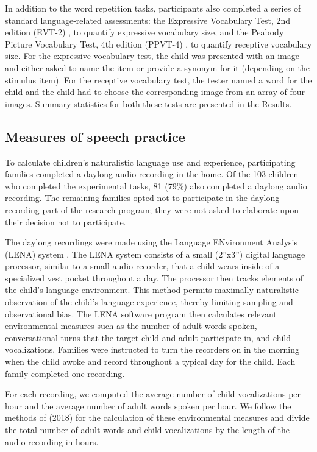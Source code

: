\documentclass[a4paper,man,natbib,donotrepeattitle, apacite]{apa6}
\begin{document}
In addition to the word repetition tasks, participants also completed a series of standard language-related assessments: the Expressive Vocabulary Test, 2nd edition (EVT-2) \cite{williamsExpressiveVocabularyTest2007}, to quantify expressive vocabulary size, and the Peabody Picture Vocabulary Test, 4th edition (PPVT-4) \cite{dunnPPVT4PeabodyPicture2007}, to quantify receptive vocabulary size. For the expressive vocabulary test, the child was presented with an image and either asked to name the item or provide a synonym for it (depending on the stimulus item). For the receptive vocabulary test, the tester named a word for the child and the child had to choose the corresponding image from an array of four images. Summary statistics for both these tests are presented in the Results.

\subsection{Measures of speech practice}

To calculate children’s naturalistic language use and experience, participating families completed a daylong audio recording in the home. Of the 103 children who completed the experimental tasks, 81 (79\%) also completed a daylong audio recording. The remaining families opted not to participate in the daylong recording part of the research program; they were not asked to elaborate upon their decision not to participate. 

The daylong recordings were made using the Language ENvironment Analysis (LENA) system \cite{greenwoodAssessingChildrenHome2011}. The LENA system consists of a small (2”x3”) digital language processor, similar to a small audio recorder, that a child wears inside of a specialized vest pocket throughout a day. The processor then tracks elements of the child’s language environment. This method permits maximally naturalistic observation of the child’s language experience, thereby limiting sampling and observational bias. The LENA software program then calculates relevant environmental measures such as the number of adult words spoken, conversational turns that the target child and adult participate in, and child vocalizations. Families were instructed to turn the recorders on in the morning when the child awoke and record throughout a typical day for the child. Each family completed one recording. 

For each recording, we computed the average number of child vocalizations per hour and the average number of adult words spoken per hour. We follow the methods of \cite{mahrUsingLanguageInput2018} (2018) for the calculation of these environmental measures and divide the total number of adult words and child vocalizations by the length of the audio recording in hours.  
\end{document}
